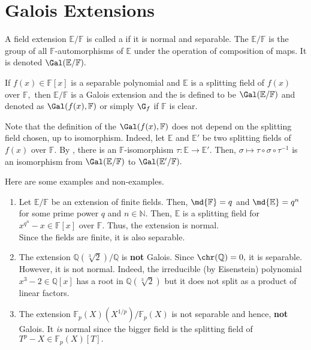 \chapter{Galois Extensions}

\begin{defn}%
    A field extension $\mathbb{E}/\mathbb{F}$ is called a  if it is normal and separable. The  $\mathbb{E}/\mathbb{F}$ is the group of all $\mathbb{F}$-automorphisms of $\mathbb{E}$ under the operation of composition of maps. It is denoted $\Gal(\mathbb{E}/\mathbb{F}).$

    If $f(x) \in \mathbb{F}[x]$ is a separable polynomial and $\mathbb{E}$ is a splitting field of $f(x)$ over $\mathbb{F},$ then $\mathbb{E}/\mathbb{F}$ is a Galois extension and the  is defined to be $\Gal(\mathbb{E}/\mathbb{F})$ and denoted as $\Gal(f(x), \mathbb{F})$ or simply $\G_f$ if $\mathbb{F}$ is clear.
\end{defn}

\begin{rem}
    Note that the definition of the $\Gal(f(x), \mathbb{F})$ does not depend on the splitting field chosen, up to isomorphism. Indeed, let $\mathbb{E}$ and $\mathbb{E}'$ be two splitting fields of $f(x)$ over $\mathbb{F}.$ By , there is an $\mathbb{F}$-isomorphism $\tau : \mathbb{E} \to \mathbb{E}'.$ Then, $\sigma \mapsto \tau \circ \sigma \circ \tau^{-1}$ is an isomorphism from $\Gal(\mathbb{E}/\mathbb{F})$ to $\Gal(\mathbb{E}'/\mathbb{F}).$
\end{rem}

\begin{ex}
    Here are some examples and non-examples.
    \begin{enumerate}
        \item Let $\mathbb{E}/\mathbb{F}$ be an extension of finite fields. Then, $\md{\mathbb{F}} = q$ and $\md{\mathbb{E}} = q^n$ for some prime power $q$ and $n \in \mathbb{N}.$ Then, $\mathbb{E}$ is a splitting field for $x^{q^n} - x \in \mathbb{F}[x]$ over $\mathbb{F}.$ Thus, the extension is normal. \\
        Since the fields are finite, it is also separable.
        \item The extension $\mathbb{Q}(\sqrt[3]{2})/\mathbb{Q}$ is \textbf{not} Galois. Since $\chr(\mathbb{Q}) = 0,$ it is separable. However, it is not normal. Indeed, the irreducible (by Eisenstein) polynomial $x^3 - 2 \in \mathbb{Q}[x]$ has a root in $\mathbb{Q}(\sqrt[3]{2})$ but it does not split as a product of linear factors.
        \item The extension $\mathbb{F}_p(X)(X^{1/p})/\mathbb{F}_p(X)$ is not separable and hence, \textbf{not} Galois. It \emph{is} normal since the bigger field is the splitting field of $T^p - X \in \mathbb{F}_p(X)[T].$
    \end{enumerate}
\end{ex}

